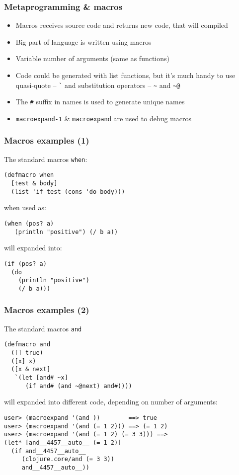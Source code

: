 \begin{frame}[t,fragile]
  \frametitle{Metaprogramming \& macros}
  \begin{itemize}
  \item Macros receives source code and returns new code, that will compiled
  \item Big part of language is written using macros
  \item Variable number of arguments (same as functions)
  \item Code could be generated with list functions, but it's much handy to use
    quasi-quote -- \lstinline!`! and substitution operators -- \lstinline!~! and
    \lstinline!~@!
  \item The \lstinline!#! suffix in names is used to generate unique names
  \item \texttt{macroexpand-1} \& \texttt{macroexpand} are used to debug macros
  \end{itemize}
\end{frame}

\begin{frame}[fragile,t]
  \frametitle{Macros examples (1)}
The standard macros \texttt{when}:
\begin{lstlisting}
(defmacro when
  [test & body]
  (list 'if test (cons 'do body)))  
\end{lstlisting}
when used as:
\begin{lstlisting}
(when (pos? a) 
   (println "positive") (/ b a))
\end{lstlisting}
will expanded into:
\begin{lstlisting}
(if (pos? a) 
  (do 
    (println "positive") 
    (/ b a)))
\end{lstlisting}
\end{frame}

\begin{frame}[fragile,t]
  \frametitle{Macros examples (2)}
The standard macros \texttt{and}
\begin{lstlisting}
(defmacro and
  ([] true)
  ([x] x)
  ([x & next]
   `(let [and# ~x]
      (if and# (and ~@next) and#))))  
\end{lstlisting}
will expanded into different code, depending on number of arguments:
\begin{lstlisting}
user> (macroexpand '(and ))        ==> true
user> (macroexpand '(and (= 1 2))) ==> (= 1 2)
user> (macroexpand '(and (= 1 2) (= 3 3))) ==>
(let* [and__4457__auto__ (= 1 2)] 
  (if and__4457__auto__ 
     (clojure.core/and (= 3 3)) 
     and__4457__auto__))
\end{lstlisting}
\end{frame}

